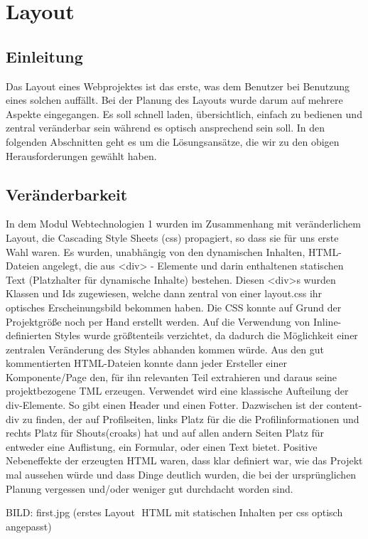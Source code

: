 \section{Layout}
\subsection{Einleitung}
Das Layout eines Webprojektes ist das erste, was dem Benutzer bei Benutzung eines solchen auffällt. Bei der Planung des Layouts wurde darum auf mehrere Aspekte eingegangen. Es soll schnell laden, übersichtlich, einfach zu bedienen und zentral veränderbar sein während es
optisch ansprechend sein soll. In den folgenden Abschnitten geht es um die Lösungsansätze, die wir zu den obigen Herausforderungen gewählt haben.

\subsection{Veränderbarkeit}
In dem Modul Webtechnologien 1 wurden im Zusammenhang mit veränderlichem Layout, die Cascading Style Sheets (css) propagiert, so dass sie für uns erste Wahl waren. Es wurden, unabhängig von den dynamischen Inhalten, HTML-Dateien angelegt, die aus <div> - Elemente und darin enthaltenen statischen Text (Platzhalter für dynamische Inhalte) bestehen. Diesen <div>s wurden Klassen und Ids zugewiesen, welche dann zentral von einer layout.css ihr optisches Erscheinungsbild bekommen haben. Die CSS konnte auf Grund der Projektgröße noch per Hand erstellt werden. Auf die Verwendung von Inline-definierten Styles wurde größtenteils verzichtet, da dadurch die Möglichkeit einer zentralen Veränderung des Styles abhanden kommen würde. Aus den gut kommentierten HTML-Dateien konnte dann jeder Ersteller einer Komponente/Page den, für ihn relevanten Teil extrahieren und daraus seine projektbezogene TML erzeugen. Verwendet wird eine klassische Aufteilung der div-Elemente. So gibt einen Header und einen Fotter. Dazwischen ist der content-div zu finden, der auf Profilseiten, links Platz für die die Profilinformationen und rechts Platz für Shouts(croaks) hat und auf allen andern Seiten Platz für entweder eine Auflistung, ein Formular, oder einen Text bietet. Positive Nebeneffekte der erzeugten HTML waren, dass klar definiert war, wie das Projekt mal aussehen würde und dass Dinge deutlich wurden, die bei der ursprünglichen Planung vergessen und/oder weniger gut durchdacht worden sind.
  
BILD: first.jpg
(erstes Layout  HTML mit statischen Inhalten per css optisch angepasst)

